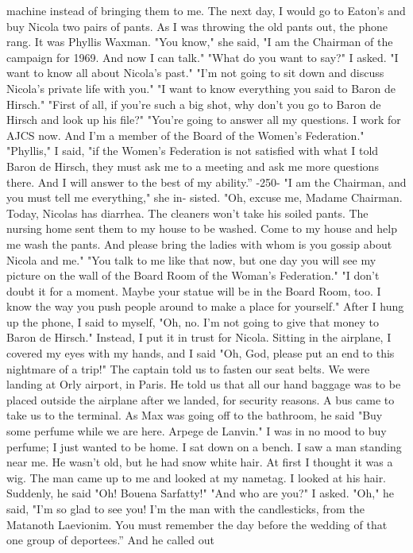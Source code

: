 machine instead of bringing them to me. The next day, I would go to 
Eaton's and buy Nicola two pairs of pants. 
As I was throwing the old pants out, the phone rang. It was 
Phyllis Waxman. 
"You know," she said, "I am the Chairman of the campaign for 1969. 
And now I can talk." 
"What do you want to say?" I asked. 
"I want to know all about Nicola's past." 
"I'm not going to sit down and discuss Nicola's private life 
with you." 
"I want to know everything you said to Baron de Hirsch." 
"First of all, if you're such a big shot, why don't you go to 
Baron de Hirsch and look up his file?" 
"You're going to answer all my questions. I work for AJCS now. 
And I'm a member of the Board of the Women's Federation." 
"Phyllis," I said, "if the Women's Federation is not satisfied 
with what I told Baron de Hirsch, they must ask me to a meeting and 
ask me more questions there. And I will answer to the best of my ability.”
-250- 
"I am the Chairman, and you must tell me everything," she in-
sisted. 
"Oh, excuse me, Madame Chairman. Today, Nicolas has diarrhea. The 
cleaners won't take his soiled pants. The nursing home sent them to 
my house to be washed. Come to my house and help me wash the pants. 
And please bring the ladies with whom is you gossip about Nicola and me." 
"You talk to me like that now, but one day you will see my picture 
on the wall of the Board Room of the Woman's Federation." 
"I don't doubt it for a moment. Maybe your statue will be in the 
Board Room, too. I know the way you push people around to make a place 
for yourself." After I hung up the phone, I said to myself, "Oh, no. 
I'm not going to give that money to Baron de Hirsch." Instead, I put 
it in trust for Nicola. 
Sitting in the airplane, I covered my eyes with my hands, and I 
said "Oh, God, please put an end to this nightmare of a trip!" The 
captain told us to fasten our seat belts. We were landing at Orly 
airport, in Paris. He told us that all our hand baggage was to be 
placed outside the airplane after we landed, for security reasons. A 
bus came to take us to the terminal. As Max was going off to the bathroom, he said "Buy some perfume while we are here. Arpege de Lanvin." 
I was in no mood to buy perfume; I just wanted to be home. 
I sat down on a bench. I saw a man standing near me. He wasn't 
old, but he had snow white hair. At first I thought it was a wig. 
The man came up to me and looked at my nametag. I looked at his hair. 
Suddenly, he said "Oh! Bouena Sarfatty!" 
"And who are you?" I asked. 
"Oh," he said, "I'm so glad to see you! I'm the man with the 
candlesticks, from the Matanoth Laevionim. You must remember the day before the wedding of that one group of deportees.” And he called out
